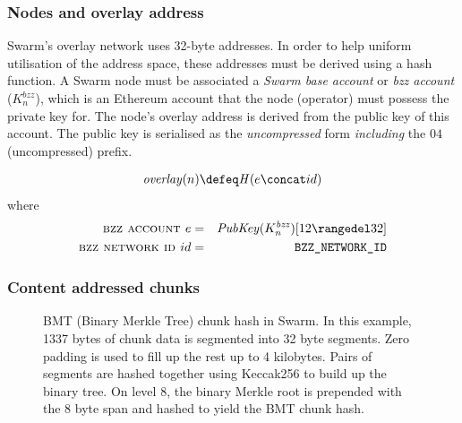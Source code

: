 \subsubsection{Nodes and overlay address \statusorange}


Swarm's overlay network uses 32-byte addresses. In order to help  uniform utilisation of the address space,  these addresses must be derived using a hash function. A Swarm node must be associated a \emph{Swarm base account} or \emph{bzz account} ($K_n^\mathit{bzz}$), which is an Ethereum account that the node (operator) must possess the private key for. The node's overlay address is derived from the public key of this account. 
The public key is serialised as the \emph{uncompressed} form \emph{including} the $04$ (uncompressed) prefix.

\begin{definition}\label{def:overlay}
\begin{eqnarray}
\mathit{overlay}(n) \defeq \mathit{H}(e\concat id)         
\end{eqnarray}
where
\begin{eqnarray}
\textsc{bzz account } e&=&    \mathit{PubKey}(K_n^\mathit{bzz})[12\rangedel32]\\
\textsc{bzz network id } id&=& \texttt{BZZ\_NETWORK\_ID}
\end{eqnarray}
\end{definition}

\subsubsection{Content addressed chunks \statusgreen}



\begin{figure}[htbp]
   \centering
   \resizebox{1\textwidth}{!}{
   }
   \caption[BMT: Binary Merkle Tree hash used as chunk hash in Swarm ]{BMT (Binary Merkle Tree) chunk hash in Swarm. In this example, 1337 bytes of chunk data is segmented into 32 byte segments. Zero padding is used to fill up the rest up to 4 kilobytes. Pairs of segments are hashed together using Keccak256 to build up the binary tree. On level 8, the binary Merkle root is prepended with the 8 byte span and hashed to yield the BMT chunk hash.}
   \label{fig:BMT}
\end{figure}

